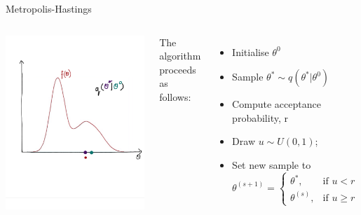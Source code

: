 \documentclass[compress]{beamer}
\begin{document}
\begin{frame}[label=sec-7-11]{Metropolis-Hastings}
\begin{columns}[c] 
\includegraphics[width=0.8\linewidth]{MH5}

The algorithm proceeds as follows:\\
\begin{itemize}
\item Initialise $\theta^{0}$
\item Sample $\theta^* \sim q(\theta^*|\theta^{0})$
\item Compute acceptance probability, r
\item Draw $u \sim U(0,1)$;
\item Set new sample to 
\[
 \theta^{(s+1)} = 
\begin{cases}
    \theta^*, & \text{if } u < r\\
    \theta^{(s)}, & \text{if } u \geqslant r
\end{cases}
\]
\end{itemize}
\end{columns}
\end{frame}
\end{document}
